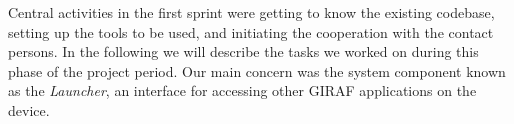 Central activities in the first sprint were getting to know the existing codebase, setting up the tools to be used, and initiating the cooperation with the contact persons.
In the following we will describe the tasks we worked on during this phase of the project period. 
Our main concern was the system component known as the \textit{Launcher}, an interface for accessing other GIRAF applications on the device.
